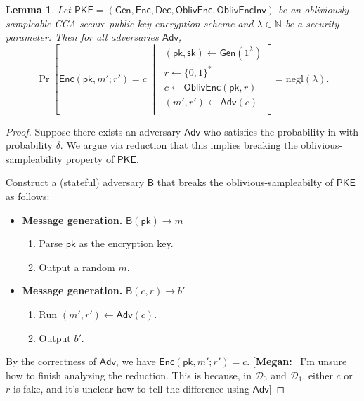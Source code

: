 \documentclass[11pt,letterpaper]{article}
\newcommand{\authnote}[2]{[{\color{red}\textbf{#1:}}~{\color{blue} #2}]}
\newcommand{\authnote}[2]{}
\newcommand{\megan}[1]{\authnote{Megan}{#1}}
\theoremstyle{plain} %
\newtheorem{lemma}[theorem]{Lemma}
\theoremstyle{definition} %
\theoremstyle{remark} %
\newcommand{\SecParam}{\lambda}
\newcommand{\PKE}{\mathsf{PKE}}
\newcommand{\Gen}{\mathsf{Gen}}
\newcommand{\Enc}{\mathsf{Enc}}
\newcommand{\OblivEnc}{\mathsf{OblivEnc}}
\newcommand{\OblivEncInv}{\mathsf{OblivEncInv}}
\newcommand{\Dec}{\mathsf{Dec}}
\newcommand{\EncKey}{\mathsf{pk}}
\newcommand{\DecKey}{\mathsf{sk}}
\newcommand{\GuessBit}{b'}
\newcommand{\Msg}{m}
\newcommand{\Ciphertext}{c}
\newcommand{\Rand}{r}
\newcommand{\Distribution}{\mathcal{D}}
\newcommand{\Adversary}{{\mathsf{Adv}}} %
\newcommand{\AdversaryB}{{\mathsf{B}}} %
\newcommand{\pST}{\; \middle| \;}
\newcommand{\negl}{\mathrm{negl}}
\newcommand{\Bits}{\{0,1\}}
\newcommand{\Naturals}{\mathbb{N}}
\begin{document}
\begin{lemma}
    Let $\PKE = (\Gen, \Enc, \Dec, \OblivEnc, \OblivEncInv)$ be an obliviously-sampleable CCA-secure public key encryption scheme and $\SecParam\in\Naturals$ be a security parameter. Then for all adversaries $\Adversary$,
    \begin{equation}
    \label{eqn:prod-msg-rand}
        \Pr \left[
            \Enc(\EncKey,\Msg';\Rand') = \Ciphertext
        \pST
        \begin{array}{r}
            (\EncKey,\DecKey) \gets \Gen(1^{\SecParam})\\
            \Rand \gets \Bits^*\\
            \Ciphertext \gets \OblivEnc(\EncKey, \Rand)\\
            (\Msg',\Rand') \gets \Adversary(\Ciphertext)\\
        \end{array}
        \right] = \negl(\SecParam).
    \end{equation}
\end{lemma}

\begin{proof}
    Suppose there exists an adversary $\Adversary$ who satisfies the probability in  with probability $\delta$. We argue via reduction that this implies breaking the oblivious-sampleability property of $\PKE$.

    Construct a (stateful) adversary $\AdversaryB$ that breaks the oblivious-sampleabilty of $\PKE$ as follows:
    \begin{itemize}
        \item \textbf{Message generation.} $\AdversaryB(\EncKey) \to \Msg$
        \begin{enumerate}[nolistsep]
            \item Parse $\EncKey$ as the encryption key.
            \item Output a random $\Msg$.
        \end{enumerate}
        \item \textbf{Message generation.} $\AdversaryB(\Ciphertext,\Rand) \to \GuessBit$
        \begin{enumerate}[nolistsep]
            \item Run $(\Msg',\Rand')\gets \Adversary(\Ciphertext)$.
            \item Output $\GuessBit$.
        \end{enumerate}
    \end{itemize}
    By the correctness of $\Adversary$, we have $\Enc(\EncKey, \Msg'; \Rand') = \Ciphertext$.
    \megan{I'm unsure how to finish analyzing the reduction. This is because, in $\Distribution_0$ and $\Distribution_1$, either $\Ciphertext$ or $\Rand$ is fake, and it's unclear how to tell the difference using $\Adversary$}
\end{proof}
\end{document}
